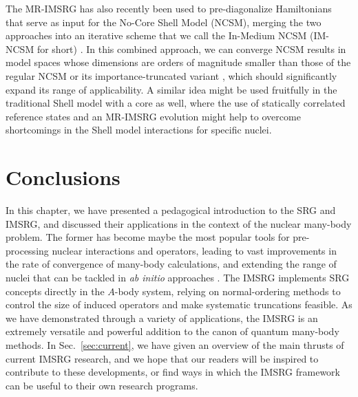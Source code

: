 {The MR-IMSRG has also recently been used to pre-diagonalize Hamiltonians
that serve as input for the No-Core Shell Model (NCSM), merging the two 
approaches into an iterative scheme that we call the In-Medium NCSM (IM-NCSM 
for short) \cite{Gebrerufael:2016rp}. In this combined approach, we can
converge NCSM results in model spaces whose dimensions are orders of
magnitude smaller than those of the regular NCSM or its importance-truncated
variant \cite{Roth:2007fk,Roth:2009eu,Roth:2014fk}, which should significantly
expand its range of applicability. A similar idea might be used fruitfully
in the traditional Shell model with a core as well, where the use of 
statically correlated reference states and an MR-IMSRG evolution might
help to overcome shortcomings in the Shell model interactions for specific
nuclei.
\section{\label{sec:conclusions}Conclusions}
In this chapter, we have presented a pedagogical introduction to the
SRG and IMSRG, and discussed their applications in the context of the
nuclear many-body problem. The former has become maybe the most popular
tools for pre-processing nuclear interactions and operators, leading to
vast improvements in the rate of convergence of many-body calculations,
and extending the range of nuclei that can be tackled in \emph{ab initio}
approaches \cite{Barrett:2013oq,Hagen:2014ve,Binder:2014fk,Soma:2014eu,
Hergert:2016jk,Hergert:2017kx}. The IMSRG implements SRG concepts directly
in the $A$-body system, relying on normal-ordering methods to control
the size of induced operators and make systematic truncations feasible.
As we have demonstrated through a variety of applications, the IMSRG
is an extremely versatile and powerful addition to the canon of 
quantum many-body methods. In Sec.~\ref{sec:current}, we have given
an overview of the main thrusts of current IMSRG research, and we
hope that our readers will be inspired to contribute to these developments,
or find ways in which the IMSRG framework can be useful to their
own research programs. 

}

